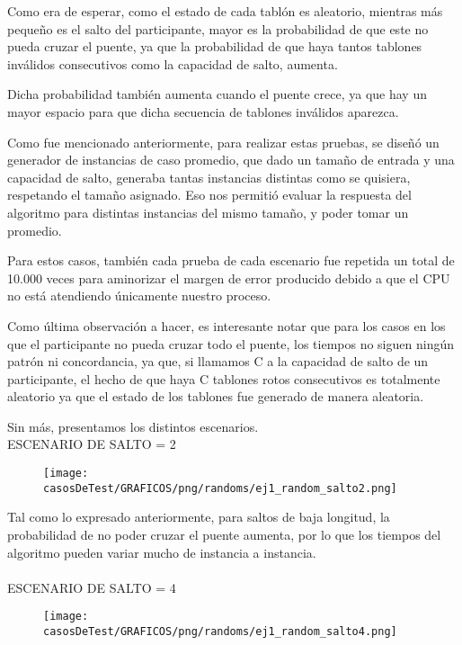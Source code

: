 \noindent Como era de esperar, como el estado de cada tablón es aleatorio, mientras más pequeño es el salto del participante, mayor es la probabilidad de que este no pueda cruzar el puente, ya que la probabilidad de que haya tantos tablones inválidos consecutivos como la capacidad de salto, aumenta.

\noindent Dicha probabilidad también aumenta cuando el puente crece, ya que hay un mayor espacio para que dicha secuencia de tablones inválidos aparezca.

\noindent Como fue mencionado anteriormente, para realizar estas pruebas, se diseñó un generador de instancias de caso promedio, que dado un tamaño de entrada y una capacidad de salto, generaba tantas instancias distintas como se quisiera, respetando el tamaño asignado. Eso nos permitió evaluar la respuesta del algoritmo para distintas instancias del mismo tamaño, y poder tomar un promedio.

\noindent Para estos casos, también cada prueba de cada escenario fue repetida un total de 10.000 veces para aminorizar el margen de error producido debido a que el CPU no está atendiendo únicamente nuestro proceso.

\noindent Como última observación a hacer, es interesante notar que para los casos en los que el participante no pueda cruzar todo el puente, los tiempos no siguen ningún patrón ni concordancia, ya que, si llamamos C a la capacidad de salto de un participante, el hecho de que haya C tablones rotos consecutivos es totalmente aleatorio ya que el estado de los tablones fue generado de manera aleatoria.

\noindent Sin más, presentamos los distintos escenarios.\\

\newpage \indent ESCENARIO DE SALTO = 2

	\begin{figure}[h]
		\begin{center}
		   \texttt{[image: casosDeTest/GRAFICOS/png/randoms/ej1\_random\_salto2.png]}
		\end{center}
	\end{figure}

Tal como lo expresado anteriormente, para saltos de baja longitud, la probabilidad de no poder cruzar el puente aumenta, por lo que los tiempos del algoritmo pueden variar mucho de instancia a instancia. \\ \\

\indent ESCENARIO DE SALTO = 4
	\begin{figure}[h]
		\begin{center}
		   \texttt{[image: casosDeTest/GRAFICOS/png/randoms/ej1\_random\_salto4.png]}
		\end{center}
	\end{figure}

